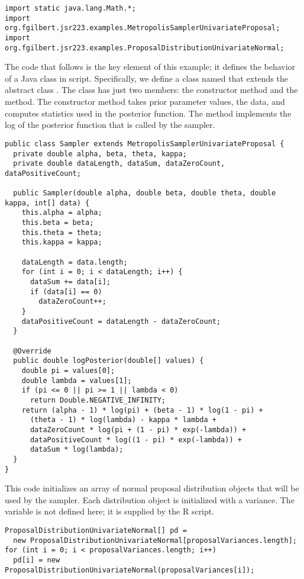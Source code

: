 \begin{verbatim}
import static java.lang.Math.*;
import org.fgilbert.jsr223.examples.MetropolisSamplerUnivariateProposal;
import org.fgilbert.jsr223.examples.ProposalDistributionUnivariateNormal;
\end{verbatim}

The code that follows is the key element of this example; it defines the behavior of a Java class in script. Specifically, we define a class named  that extends the abstract class . The  class has just two members: the constructor method and the  method. The constructor method takes prior parameter values, the data, and computes statistics used in the posterior function. The  method implements the log of the posterior function that is called by the sampler.

\begin{verbatim}
public class Sampler extends MetropolisSamplerUnivariateProposal {
  private double alpha, beta, theta, kappa;
  private double dataLength, dataSum, dataZeroCount, dataPositiveCount;

  public Sampler(double alpha, double beta, double theta, double kappa, int[] data) {
    this.alpha = alpha;
    this.beta = beta;
    this.theta = theta;
    this.kappa = kappa;

    dataLength = data.length;
    for (int i = 0; i < dataLength; i++) {
      dataSum += data[i];
      if (data[i] == 0)
        dataZeroCount++;
    }
    dataPositiveCount = dataLength - dataZeroCount;
  }

  @Override
  public double logPosterior(double[] values) {
    double pi = values[0];
    double lambda = values[1];
    if (pi <= 0 || pi >= 1 || lambda < 0)
      return Double.NEGATIVE_INFINITY;
    return (alpha - 1) * log(pi) + (beta - 1) * log(1 - pi) +
      (theta - 1) * log(lambda) - kappa * lambda +
      dataZeroCount * log(pi + (1 - pi) * exp(-lambda)) +
      dataPositiveCount * log((1 - pi) * exp(-lambda)) +
      dataSum * log(lambda);
  }
}
\end{verbatim}

This code initializes an array of normal proposal distribution objects that will be used by the sampler. Each distribution object is initialized with a variance. The  variable is not defined here; it is supplied by the R script.
\begin{verbatim}
ProposalDistributionUnivariateNormal[] pd =
  new ProposalDistributionUnivariateNormal[proposalVariances.length];
for (int i = 0; i < proposalVariances.length; i++)
  pd[i]	= new ProposalDistributionUnivariateNormal(proposalVariances[i]);
\end{verbatim}

